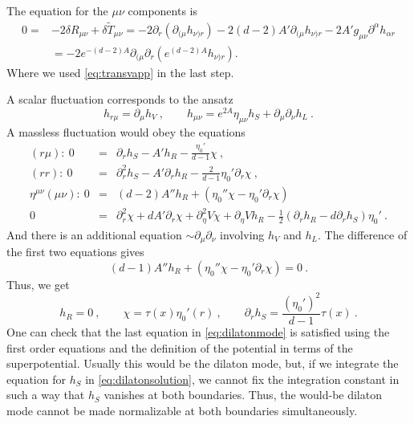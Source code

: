 The equation for the $\mu\nu$ components is
\begin{align}
0=& -2\delta R_{\mu\nu}+\delta \widetilde T_{\mu\nu}
=-2\partial_r\left(\partial_{(\mu}h_{\nu)r}\right)-2(d-2)A'\partial_{(\mu}h_{\nu)r}-2A' g_{\mu\nu}\partial^\alpha h_{\alpha r}
\\ \nonumber&=-2e^{-(d-2)A}\partial_{(\mu}\partial_r\left( e^{(d-2)A} h_{\nu)r}\right).
\end{align}
Where we used \eqref{eq:transvapp} in the last step.

A scalar fluctuation corresponds to the ansatz
\begin{equation}
	h_{r\mu}=\partial_\mu h_V
	\ ,\qquad h_{\mu\nu}=e^{2A}\eta_{\mu\nu}h_S+\partial_\mu\partial_\nu h_L\ .
\end{equation}
A massless fluctuation would obey the equations
\begin{subequations}\label{eq:dilatonmode}
\begin{eqnarray}
	(r\mu): \ 0 &=& \partial_r h_S-A' h_R-\frac{\eta_0'}{d-1}\chi
	\ ,\\
	(rr): \ 0&=& \partial_r^2 h_S-A'\partial_r h_R-\frac{2}{d-1}\eta_0'\partial_r \chi
	\ ,\\
	\eta^{\mu\nu}(\mu\nu): \ 0&=&(d-2) A'' h_R+(\eta_0''\chi-\eta_0' \partial_r\chi)\\
	0&=& \partial_r^2 \chi+dA'\partial_r\chi+\partial_\eta^2 V\chi+\partial_\eta V h_R-\frac{1}{2}(\partial_r h_R-d\partial_r h_S)\eta_0'\ .
\end{eqnarray}
\end{subequations}
And there is an additional equation $\sim \partial_\mu\partial_\nu$ involving $h_V$ and $h_L$.
The difference of the first two equations gives
\begin{equation}
	(d-1)A''h_R+(\eta_0''\chi-\eta_0'\partial_r\chi)=0\ .
\end{equation}
Thus, we get
\begin{equation}\label{eq:dilatonsolution}
	h_R=0
	\ ,\qquad \chi=\tau(x) \eta_0'(r)
	\ ,\qquad
	\partial_r h_S=\frac{(\eta_0')^2}{d-1}\tau(x)\ .
\end{equation}
One can check that the last equation in \eqref{eq:dilatonmode} is satisfied using the first order equations and the definition of the potential in terms of the superpotential. Usually this would be the dilaton mode, but, if we integrate the equation for $h_S$ in \eqref{eq:dilatonsolution}, we cannot fix the integration constant in such a way that $h_S$ vanishes at both boundaries. Thus, the would-be dilaton mode cannot be made normalizable at both boundaries simultaneously.

